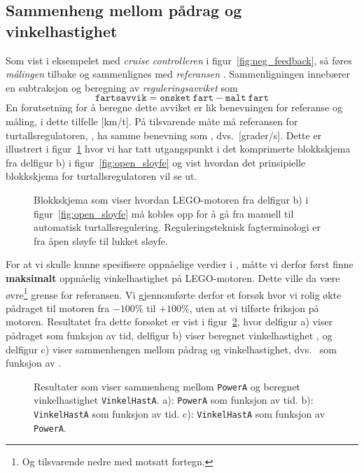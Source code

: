 \subsection{Sammenheng mellom pådrag og vinkelhastighet}
Som vist i eksempelet med
 {\em cruise controlleren} i 
figur~\ref{fig:neg_feedback}, så føres {\em målingen} 
 tilbake og sammenlignes 
med {\em referansen} . Sammenligningen
innebærer en subtraksjon og beregning av {\em reguleringsavviket} 
 som
\begin{equation}
  \label{eq:3}
  \mathtt{fartsavvik}=
  \mathtt{onsket~fart}-\mathtt{malt~fart}
\end{equation}
En forutsetning for å beregne dette avviket er lik benevningen 
for referanse og måling, i dette tilfelle [km/t].
På tilsvarende måte må referansen for
turtallsregulatoren, 
 , ha samme
benevning som , dvs.\ [grader/s]. Dette er illustrert
i figur~\ref{fig:neg_feedback_vinkel} hvor vi har tatt utgangspunkt i
det komprimerte blokkskjema fra delfigur b) i
figur~\ref{fig:open_sloyfe} og vist hvordan det prinsipielle
blokkskjema for turtallsregulatoren vil se ut.
\begin{figure}[H]
  \centering
  \hspace*{-10mm}
  \caption{Blokkskjema som viser hvordan LEGO-motoren fra
    delfigur b) i figur~\ref{fig:open_sloyfe} 
    må kobles opp
    for å gå fra manuell til automatisk
    turtallsregulering. Reguleringsteknisk fagterminologi er fra åpen
    sløyfe til lukket sløyfe.} 
  \label{fig:neg_feedback_vinkel}
\end{figure}

For at vi skulle kunne
spesifisere oppnåelige verdier i ,
måtte vi derfor først finne {\bf maksimalt} oppnåelig vinkelhastighet på
LEGO-motoren.  Dette ville da 
være øvre\footnote{Og tilsvarende nedre med motsatt fortegn.}
grense for referansen.
Vi gjennomførte derfor et forsøk hvor vi rolig økte pådraget til
motoren fra $-100$\% til $+100$\%, uten at vi tilførte friksjon på  motoren. 
Resultatet fra dette forsøket er vist i
figur~\ref{fig:power_vs_turtall}, hvor delfigur a)  viser pådraget
 som
funksjon av tid, delfigur b) viser beregnet vinkelhastighet 
, og
delfigur c) viser sammenhengen mellom pådrag og vinkelhastighet, dvs.\
 som funksjon av . 
\begin{figure}[H]
  \centering
  \hspace*{-10mm}
  \caption{Resultater som viser sammenheng mellom {\tt PowerA} og
    beregnet vinkelhastighet  {\tt VinkelHastA}. a): {\tt PowerA} som
    funksjon av tid. b): {\tt VinkelHastA} som funksjon av tid. c):
    {\tt VinkelHastA} som funksjon av {\tt PowerA}. } 
  \label{fig:power_vs_turtall}
\end{figure}

